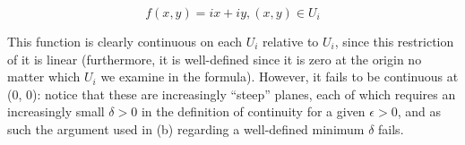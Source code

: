 \begin{solution}
    \[f(x, y) =  i x + i y, (x, y) \in U_i\]

    This function is clearly continuous on each $U_i$ relative to $U_i$, since this restriction of it is linear (furthermore, it is well-defined since it is zero at the origin no matter which $U_i$ we examine in the formula).
    However, it fails to be continuous at (0, 0): notice that these are increasingly ``steep'' planes, each of which requires an increasingly small $\delta > 0$ in the definition of continuity for a given $\epsilon > 0$, and as such the argument used in (b) regarding a well-defined minimum $\delta$ fails.
\end{solution}